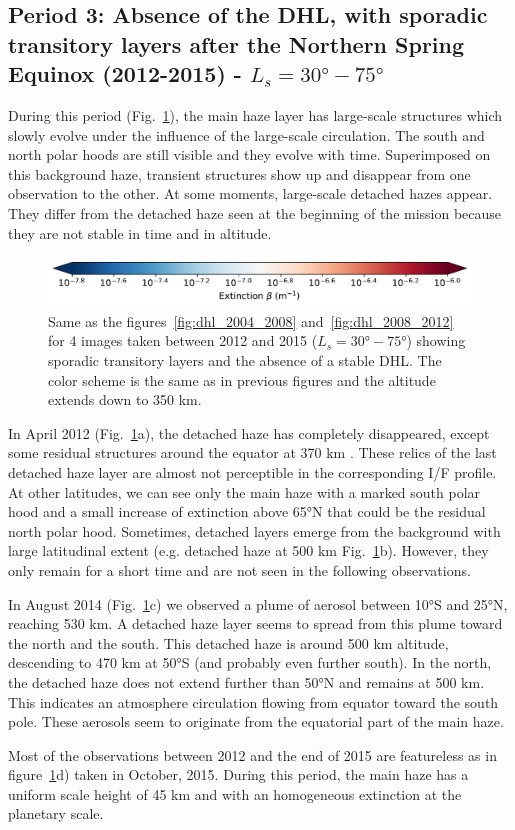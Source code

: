 \subsection{Period 3: Absence of the DHL, with sporadic transitory layers after the Northern Spring Equinox (2012-2015) - $L_s=\ang{30}-\ang{75}$}

During this period (Fig.~\ref{fig:dhl_2012_2015}), the main haze layer has large-scale structures which slowly evolve under the influence of the
large-scale circulation. The south and north polar hoods are still visible and they evolve
with time. Superimposed on this background haze, transient structures show up and disappear from one observation
to the other. At some moments, large-scale detached hazes appear. They differ from the detached haze seen at the
beginning of the mission because they are not stable in time and in altitude.

\begin{figure}[!ht]
\includegraphics[width=.5\textwidth]{Fig/Extinction_colorbar}
\caption{Same as the figures~\ref{fig:dhl_2004_2008} and~\ref{fig:dhl_2008_2012}
for 4 images taken between 2012 and 2015 ($L_s=\ang{30}-\ang{75}$) showing sporadic
transitory layers and the absence of a stable DHL.
The color scheme is the same as in previous figures and the altitude extends down to 350 km.}
\label{fig:dhl_2012_2015}
\end{figure}

In April 2012 (Fig.~\ref{fig:dhl_2012_2015}a), the detached haze has completely disappeared, except some residual
structures around the equator at 370 km .
These relics of the last detached haze layer are almost not perceptible in the corresponding I/F profile. At other
latitudes, we can see only the main haze with a marked south polar hood and a small increase of extinction above
\ang{65}N that could be the residual north polar hood. Sometimes, detached layers emerge from the background with large latitudinal
extent (e.g. detached haze at 500 km Fig.~\ref{fig:dhl_2012_2015}b). However, they only remain for a short time
and are not seen in the following observations.

In August 2014 (Fig.~\ref{fig:dhl_2012_2015}c) we observed a plume of aerosol between \ang{10}S and \ang{25}N,
reaching 530 km. A detached haze layer seems to spread from this plume toward the north and the south. This
detached haze is around 500 km altitude, descending to 470 km at \ang{50}S (and probably even further south). In the
north, the detached haze does not extend further than \ang{50}N and remains at 500 km. This indicates an
atmosphere circulation flowing from equator toward the south pole. These aerosols seem to originate
from the equatorial part of the main haze.

Most of the observations between 2012 and the end of 2015 are featureless as in figure~\ref{fig:dhl_2012_2015}d)
taken in October, 2015. During this period, the main haze has a uniform scale height of 45 km and
with an homogeneous extinction at the planetary scale.
